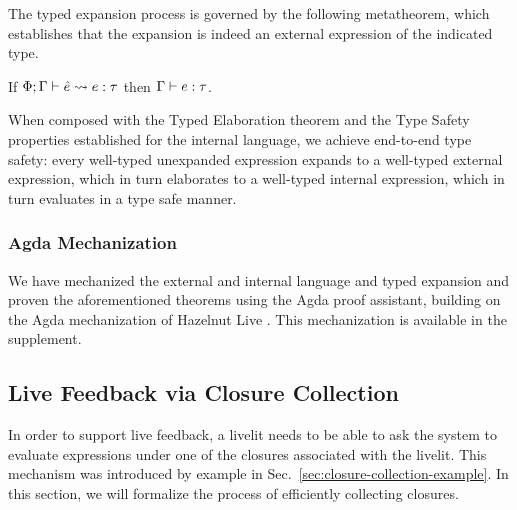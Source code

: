 The typed expansion process is governed by the following metatheorem, which establishes that the expansion
is indeed an external expression of the indicated type.



\begin{theorem}
    If $\Phi; \Gamma \vdash \hat e \leadsto e : \tau$ then $\Gamma \vdash e : \tau$.
\end{theorem}

When composed with the Typed Elaboration theorem and the Type Safety properties established for the internal
language, we achieve end-to-end type safety: every well-typed unexpanded
expression expands to a well-typed external expression, which in turn elaborates to a well-typed internal
expression, which in turn evaluates in a type safe manner.

\subsubsection{Agda Mechanization}
\label{sec:agda}
We have mechanized the external and internal language and 
typed expansion and proven the aforementioned theorems
using the Agda proof assistant, building on the Agda mechanization 
of Hazelnut Live \cite{HazelnutLive}. This mechanization is available in the supplement. 


\subsection{Live Feedback via Closure Collection}\label{sec:calculus-closure-collection}
In order to support live feedback, a livelit needs to be able to ask the system
to evaluate expressions under one of the closures associated with the livelit.
This mechanism was introduced by example in Sec.~\ref{sec:closure-collection-example}.
In this section, we will formalize the process of efficiently collecting closures.

